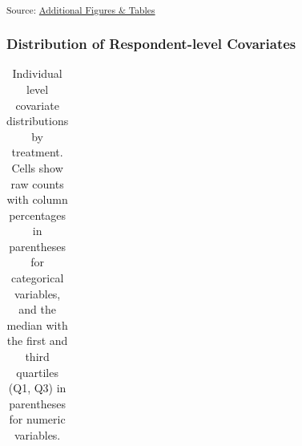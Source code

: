 \documentclass[
  10pt,
  a4paper,
  DIV=11,
  numbers=noendperiod]{scrartcl}
\begin{document}
{\begin{longtable}[]
\end{longtable}

}

\textsubscript{Source:
\href{https://dertristan.github.io/MBEU25/code/09_additional_figs_tables-preview.html\#cell-tbl-balance-round-mods}{Additional
Figures \& Tables}}

\subsubsection*{Distribution of Respondent-level
Covariates}\label{distribution-of-respondent-level-covariates}

{

\begin{longtable}[]{@{}
  >{\raggedright\arraybackslash}p{}
  >{\raggedright\arraybackslash}p{}
  >{\raggedright\arraybackslash}p{}@{}}

\caption{\label{tbl-balance-resp-mods}Individual level covariate
distributions by treatment. Cells show raw counts with column
percentages in parentheses for categorical variables, and the median
with the first and third quartiles (Q1, Q3) in parentheses for numeric
variables.}

\tabularnewline


\end{longtable}}
\end{document}
